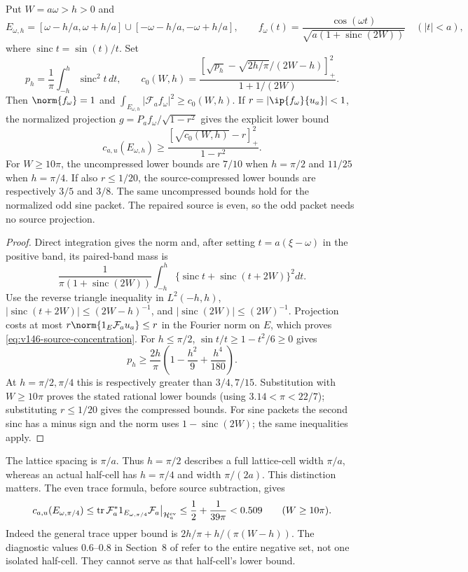 \begin{lemma}
\label{lem:v146-packet-concentration}
Put $W=a\omega>h>0$ and
\[
 E_{\omega,h}=[\omega-h/a,\omega+h/a]
                  \cup[-\omega-h/a,-\omega+h/a],\qquad
 f_\omega(t)=\frac{\cos(\omega t)}{\sqrt{a(1+\operatorname{sinc}(2W))}}
                  \quad(|t|<a),
\]
where $\operatorname{sinc}t=\sin(t)/t$. Set
\[
 p_h=\frac1\pi\int_{-h}^h\operatorname{sinc}^2t\,dt,\qquad
 c_0(W,h)=\frac{\left[\sqrt{p_h}
              -\sqrt{2h/\pi}/(2W-h)\right]_+^2}{1+1/(2W)}.
\]
Then $\norm{f_\omega}=1$ and
$\int_{E_{\omega,h}}|\mathcal F_af_\omega|^2\ge c_0(W,h)$.
If $r=|\ip{f_\omega}{u_a}|<1$, the normalized projection
$g=P_af_\omega/\sqrt{1-r^2}$ gives the explicit lower bound
\begin{equation}\label{eq:v146-source-concentration}
 c_{a,u}(E_{\omega,h})\ge
   \frac{[\sqrt{c_0(W,h)}-r]_+^2}{1-r^2}.
\end{equation}
For $W\ge10\pi$, the uncompressed lower bounds are $7/10$ when
$h=\pi/2$ and $11/25$ when $h=\pi/4$. If also $r\le1/20$, the
source-compressed lower bounds are respectively $3/5$ and $3/8$.
The same uncompressed bounds hold for the normalized odd sine packet.
The repaired source is even, so the odd packet needs no source projection.
\end{lemma}
\begin{proof}
Direct integration gives the norm and, after setting
$t=a(\xi-\omega)$ in the positive band, its paired-band mass is
\[
 \frac1{\pi(1+\operatorname{sinc}(2W))}
 \int_{-h}^h\{\operatorname{sinc}t+\operatorname{sinc}(t+2W)\}^2dt.
\]
Use the reverse triangle inequality in $L^2(-h,h)$,
$|\operatorname{sinc}(t+2W)|\le(2W-h)^{-1}$, and
$|\operatorname{sinc}(2W)|\le(2W)^{-1}$. Projection costs at most
$r\norm{1_E\mathcal F_au_a}\le r$ in the Fourier norm on $E$,
which proves \eqref{eq:v146-source-concentration}.
For $h\le\pi/2$, $\sin t/t\ge1-t^2/6\ge0$ gives
\[
 p_h\ge\frac{2h}{\pi}\left(1-\frac{h^2}{9}+\frac{h^4}{180}\right).
\]
At $h=\pi/2,\pi/4$ this is respectively greater than $3/4,7/15$.
Substitution with $W\ge10\pi$ proves the stated rational lower bounds
(using $3.14<\pi<22/7$); substituting $r\le1/20$ gives the compressed
bounds. For sine packets the second sinc has a minus sign and the norm
uses $1-\operatorname{sinc}(2W)$; the same inequalities apply.
\end{proof}

The lattice spacing is $\pi/a$. Thus $h=\pi/2$ describes a full
lattice-cell width $\pi/a$, whereas an actual half-cell has
$h=\pi/4$ and width $\pi/(2a)$. This distinction matters. The even
trace formula, before source subtraction, gives
\begin{equation}\label{eq:v146-halfcell-upper}
 c_{a,u}(E_{\omega,\pi/4})
 \le\operatorname{tr}\mathcal F_a^*1_{E_{\omega,\pi/4}}\mathcal F_a
       \big|_{\mathcal H_a^{\rm ev}}
 \le\frac12+\frac1{39\pi}<0.509\qquad(W\ge10\pi).
\end{equation}
Indeed the general trace upper bound is $2h/\pi+h/(\pi(W-h))$.
The diagnostic values $0.6$--$0.8$ in Section~8 of
 refer to the entire
negative set, not one isolated half-cell. They cannot serve as that
half-cell's lower bound.

